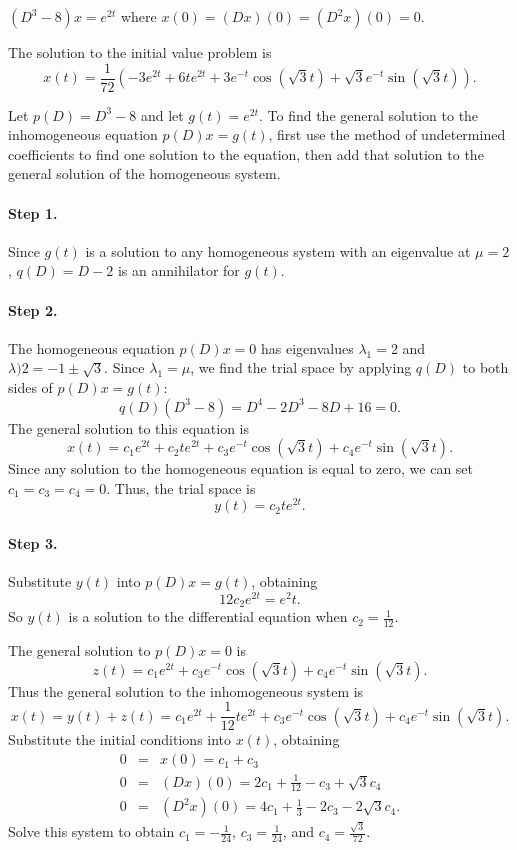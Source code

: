 \documentclass{ximera}
\begin{document}
\begin{exercise}  \label{c12.4.9}
$(D^3-8)x = e^{2t}$ where $x(0)=(Dx)(0)=(D^2x)(0)=0$.

\begin{solution}
\ans The solution to the initial value problem is
\[
x(t) = \frac{1}{72}(-3e^{2t} + 6te^{2t} + 3e^{-t}\cos(\sqrt{3}t)
+ \sqrt{3}e^{-t}\sin(\sqrt{3}t)).
\]

\soln Let $p(D) = D^3 - 8$ and let $g(t) = e^{2t}$.  To find the general
solution to the inhomogeneous equation $p(D)x = g(t)$, first use the
method of undetermined coefficients to find one solution to the
equation, then add that solution to the general solution of the
homogeneous system.

\paragraph{Step 1.} Since $g(t)$ is a solution to any homogeneous
system with an eigenvalue at $\mu = 2$, $q(D) = D - 2$ is an annihilator
for $g(t)$.

\paragraph{Step 2.} The homogeneous equation $p(D)x = 0$ has eigenvalues
$\lambda_1 = 2$ and $\lambda)2 = -1 \pm \sqrt{3}$.  Since $\lambda_1 =
\mu$, we find the trial space by applying $q(D)$ to both sides of
$p(D)x = g(t)$:
\[
q(D)(D^3 - 8) = D^4 - 2D^3 - 8D + 16 = 0.
\]
The general solution to this equation is
\[
x(t) = c_1e^{2t} + c_2te^{2t} + c_3e^{-t}\cos(\sqrt{3}t)
+ c_4e^{-t}\sin(\sqrt{3}t).
\]
Since any solution to the homogeneous equation is equal to zero, we can
set $c_1 = c_3 = c_4 = 0$.  Thus, the trial space is
\[
y(t) = c_2te^{2t}.
\]
\paragraph{Step 3.} Substitute $y(t)$ into $p(D)x = g(t)$, obtaining
\[
12c_2e^{2t} = e^2t.
\]
So $y(t)$ is a solution to the differential equation when $c_2 = \frac{1}{12}$.

\para The general solution to $p(D)x = 0$ is
\[
z(t) = c_1e^{2t} + c_3e^{-t}\cos(\sqrt{3}t) + c_4e^{-t}\sin(\sqrt{3}t).
\]
Thus the general solution to the inhomogeneous system is
\[
x(t) = y(t) + z(t) = c_1e^{2t} + \frac{1}{12}te^{2t}
+ c_3e^{-t}\cos(\sqrt{3}t) + c_4e^{-t}\sin(\sqrt{3}t).
\]
Substitute the initial conditions into $x(t)$, obtaining
\[
\begin{array}{rcl}
0 & = & x(0) = c_1 + c_3 \\
0 & = & (Dx)(0) = 2c_1 + \frac{1}{12} - c_3 + \sqrt{3}c_4 \\
0 & = & (D^2x)(0) = 4c_1 + \frac{1}{3} - 2c_3 - 2\sqrt{3}c_4.
\end{array}
\]
Solve this system to obtain $c_1 = -\frac{1}{24}$, $c_3 = \frac{1}{24}$,
and $c_4 = \frac{\sqrt{3}}{72}$.

\end{solution}
\end{exercise}
\end{document}
